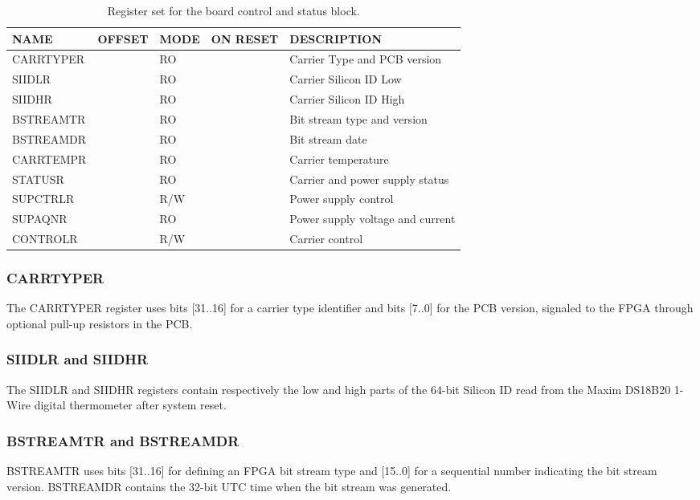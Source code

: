 \documentclass{article}
\begin{document}
\begin{table}[htbp]
  \centering
  \begin{tabularx}{\textwidth}{|l|r|l|l|X|}
    \hline
    \textbf{NAME} & \textbf{OFFSET} & \textbf{MODE} & \textbf{ON RESET} & \textbf{DESCRIPTION} \\
    \hline
    \hline
    CARRTYPER & & RO & & Carrier Type and PCB version\\
    \hline
    SIIDLR & & RO & & Carrier Silicon ID Low \\
    \hline
    SIIDHR & & RO & & Carrier Silicon ID High \\
    \hline
    BSTREAMTR & & RO & & Bit stream type and version \\
    \hline
    BSTREAMDR & & RO & & Bit stream date \\
    \hline
    CARRTEMPR & & RO & & Carrier temperature \\
    \hline
    STATUSR & & RO & & Carrier and power supply status \\
    \hline
    SUPCTRLR & & R/W & & Power supply control \\
    \hline
    SUPAQNR & & RO & & Power supply voltage and current \\
    \hline
    CONTROLR & & R/W & & Carrier control \\
    \hline
  \end{tabularx}
  \caption{Register set for the board control and status block.}
  \label{tab:stat_control}
\end{table}

\subsubsection{CARRTYPER}
The CARRTYPER register uses bits [31..16] for a carrier type identifier and bits [7..0] for the PCB version, signaled to the FPGA through optional pull-up resistors in the PCB. 

\subsubsection{SIIDLR and SIIDHR}
The SIIDLR and SIIDHR registers contain respectively the low and high parts of the 64-bit Silicon ID read from the Maxim DS18B20 1-Wire digital thermometer after system reset. 

\subsubsection{BSTREAMTR and BSTREAMDR}
BSTREAMTR uses bits [31..16] for defining an FPGA bit stream type and [15..0] for a sequential number indicating the bit stream version. BSTREAMDR contains the 32-bit UTC time when the bit stream was generated. 
\end{document}
